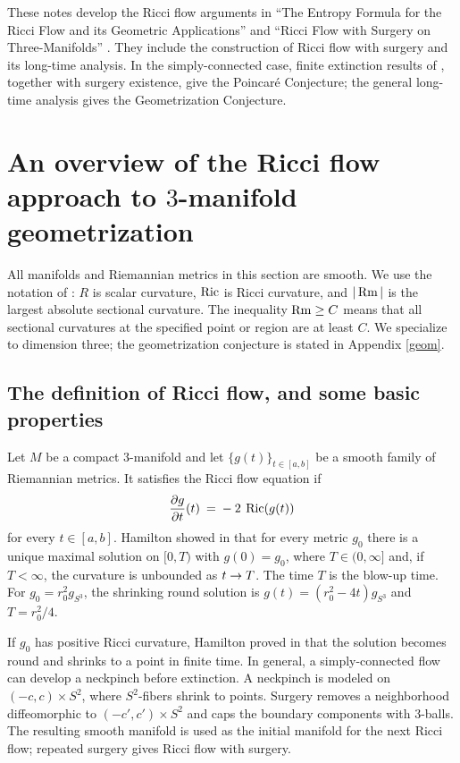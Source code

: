 These notes develop the Ricci flow arguments in
``The Entropy Formula for the Ricci Flow and its Geometric
Applications'' \cite{Perelman} and ``Ricci Flow with Surgery
on Three-Manifolds'' \cite{Perelman2}.  They include the construction of
Ricci flow with surgery and its long-time analysis.  In the simply-connected
case, finite extinction results of
\cite{Colding-Minicozzi,Colding-Minicozzi2,Perelman3}, together with surgery
existence, give the Poincar\'e Conjecture; the general long-time analysis gives
the Geometrization Conjecture.

\section{An overview of the Ricci flow approach to
$3$-manifold geometrization}
\label{overview0}

All manifolds and Riemannian metrics in this section are smooth.  We use the
notation of \cite{Perelman,Perelman2}: $R$ is scalar curvature, $\operatorname{Ric}$ is
Ricci curvature, and $|\operatorname{Rm}|$ is the largest absolute sectional curvature.
The inequality $\operatorname{Rm}\geq C$ means that all sectional curvatures at the
specified point or region are at least $C$.  We specialize to dimension three;
the geometrization conjecture is stated in Appendix \ref{geom}.

\subsection{The definition of Ricci flow, and some basic properties}

Let $M$ be a compact $3$-manifold and let $\{g(t)\}_{t\in [a,b]}$ be a
smooth family of Riemannian metrics.  It satisfies the Ricci flow equation if
\begin{equation}
\frac{\partial g}{\partial t}(t) \: = \:
-\:2\:\operatorname{Ric}(g(t))
\end{equation}
for every $t\in[a,b]$.  Hamilton showed in \cite{Hamiltonnnnn} that for
every metric $g_0$ there is a unique maximal solution on $[0,T)$ with
$g(0)=g_0$, where $T\in(0,\infty]$ and, if $T<\infty$, the curvature is
unbounded as $t\rightarrow T$.  The time $T$ is the blow-up time.  For
$g_0=r_0^2g_{S^3}$, the shrinking round solution is
$g(t)=(r_0^2-4t)g_{S^3}$ and $T=r_0^2/4$.

If $g_0$ has positive Ricci curvature, Hamilton proved in \cite{Hamilton}
that the solution becomes round and shrinks to a point in finite time.  In
general, a simply-connected flow can develop a neckpinch before extinction.
A neckpinch is modeled on $(-c,c)\times S^2$, where $S^2$-fibers shrink to
points.  Surgery removes a neighborhood diffeomorphic to
$(-c',c')\times S^2$ and caps the boundary components with $3$-balls.  The
resulting smooth manifold is used as the initial manifold for the next Ricci
flow; repeated surgery gives Ricci flow with surgery.

